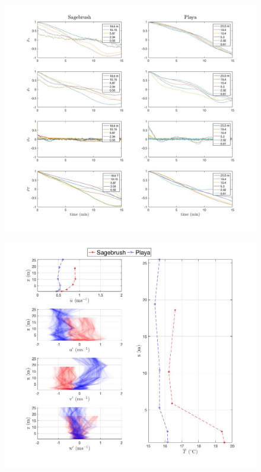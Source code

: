 \documentclass[]{article}
\begin{document}
\begin{figure}
	\centering
	\includegraphics[width=\textwidth]{auto_corr_fig}
	\caption{}
	\label{fig:autocorr}
\end{figure}

\begin{figure}
	\centering
	\includegraphics[width=\textwidth]{u_T}
	\caption{}
	\label{fig:u_T}
\end{figure}
\end{document}
